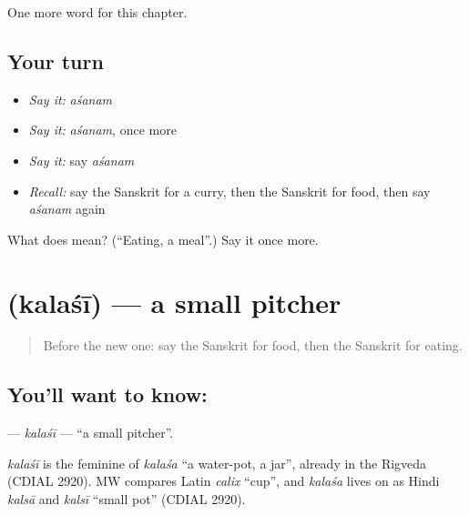 \begin{grammarlens}[title={What you've built}]
One more word for this chapter.
\end{grammarlens}

\subsection*{Your turn}
\begin{itemize}
\raggedright
  \item \emph{Say it:} \emph{aśanam}
  \item \emph{Say it:} \emph{aśanam}, once more
  \item \emph{Say it:} say \emph{aśanam}
  \item \emph{Recall:} say the Sanskrit for a curry, then the Sanskrit for food, then say \emph{aśanam} again
\end{itemize}

\begin{tcolorbox}[breakable,colback=teal!4,colframe=teal!35!black,title={Before you move on}]
What does  mean? (\textquotedblleft{}Eating, a meal\textquotedblright{}.) Say it once more.
\end{tcolorbox}
\section[\texorpdfstring{\sk{कलशी} (kalaśī)}{कलशी (kalaśī)}]{ (kalaśī) — a small pitcher}

\label{lesson:SA-C160-kalasi}



\begin{quote}
Before the new one: say the Sanskrit for food, then the Sanskrit for eating.
\end{quote}

\subsection*{You'll want to know: }
\textbf{} — \emph{kalaśī} — \textquotedblleft{}a small pitcher\textquotedblright{}.

\begin{cousinweb}
\emph{kalaśī} is the feminine of \emph{kalaśa} \textquotedblleft{}a water-pot, a jar\textquotedblright{}, already in the Rigveda (CDIAL 2920). MW compares Latin \emph{calix} \textquotedblleft{}cup\textquotedblright{}, and \emph{kalaśa} lives on as Hindi \emph{kalsā} and \emph{kalsī} \textquotedblleft{}small pot\textquotedblright{} (CDIAL 2920).
\end{cousinweb}


